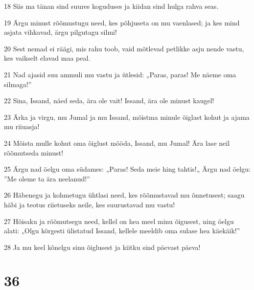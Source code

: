\par 18 Siis ma tänan sind suures koguduses ja kiidan sind hulga rahva seas.
\par 19 Ärgu minust rõõmustugu need, kes põhjuseta on mu vaenlased; ja kes mind asjata vihkavad, ärgu pilgutagu silmi!
\par 20 Sest nemad ei räägi, mis rahu toob, vaid mõtlevad petlikke asju nende vastu, kes vaikselt elavad maa peal.
\par 21 Nad ajasid suu ammuli mu vastu ja ütlesid: „Paras, paras! Me näeme oma silmaga!”
\par 22 Sina, Issand, näed seda, ära ole vait! Issand, ära ole minust kaugel!
\par 23 Ärka ja virgu, mu Jumal ja mu Issand, mõistma minule õiglast kohut ja ajama mu riiuasja!
\par 24 Mõista mulle kohut oma õiglust mööda, Issand, mu Jumal! Ära lase neil rõõmutseda minust!
\par 25 Ärgu nad öelgu oma südames: „Paras! Seda meie hing tahtis!„ Ärgu nad öelgu: ”Me oleme ta ära neelanud!”
\par 26 Häbenegu ja kohmetugu ühtlasi need, kes rõõmustavad mu õnnetusest; saagu häbi ja teotus riietuseks neile, kes suurustavad mu vastu!
\par 27 Hõisaku ja rõõmutsegu need, kellel on hea meel minu õigusest, ning öelgu alati: „Olgu kõrgesti ülistatud Issand, kellele meeldib oma sulase hea käekäik!”
\par 28 Ja mu keel kõnelgu sinu õiglusest ja kiitku sind päevast päeva!

\chapter{36}

